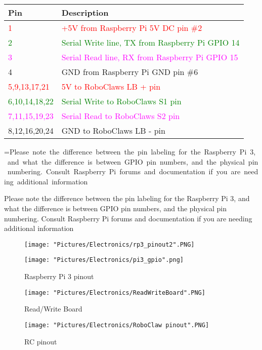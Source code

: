 \documentclass[12pt]{article}
\makeatletter
\newcommand{\mybox}[1]{%
  \setbox0=\hbox{#1}%
  \setlength{\@tempdima}{\dimexpr\wd0+13pt}%
  \begin{tcolorbox}[colframe=mycolor,boxrule=0.5pt,arc=4pt,
      left=6pt,right=6pt,top=6pt,bottom=6pt,boxsep=0pt,width=0.95\textwidth]
    #1
  \end{tcolorbox}
}
\makeatother
\begin{document}
\begin{tabular}[2] {| p{2.5cm} | p{11cm} |}
	\hline
	\textbf{Pin} & \textbf{Description} \\ \hline
	\textcolor{red}{1} & \textcolor{red}{+5V from Raspberry Pi 5V DC pin \#2} \\ \hline
	\textcolor{green}{2} & \textcolor{green}{Serial Write line, TX from Raspberry Pi GPIO 14} \\ \hline
	\textcolor{magenta}{3} & \textcolor{magenta}{Serial Read line, RX from Raspberry Pi GPIO 15}	\\ \hline
	4 & GND from Raspberry Pi GND pin \#6 \\ \hline
	\textcolor{red}{5,9,13,17,21} & \textcolor{red}{5V to RoboClaws LB + pin} \\ \hline
	\textcolor{green}{6,10,14,18,22} & \textcolor{green}{Serial Write to RoboClaws S1 pin} \\ \hline
	\textcolor{magenta}{7,11,15,19,23} & \textcolor{magenta}{Serial Read to RoboClaws S2 pin} \\ \hline
	8,12,16,20,24 & GND to RoboClaws LB - pin \\ \hline 
\end{tabular}

\bigskip 

\mybox{Please note the difference between the pin labeling for the Raspberry Pi 3, and what the difference is between GPIO pin numbers, and the physical pin numbering. Consult Raspberry Pi forums and documentation if you are needing additional information}


\begin{figure}[H]
 	\centering
  	\begin{minipage}[b]{0.35\textwidth}
		\texttt{[image: "Pictures/Electronics/rp3\_pinout2".PNG]}
  	\end{minipage}
  	\hfill
  	\begin{minipage}[b]{0.45\textwidth}
    		\texttt{[image: "Pictures/Electronics/pi3\_gpio".png]}
  	\end{minipage}
	\caption{Raspberry Pi 3 pinout}
	\label{RPi 3 pinout}
\end{figure}

\begin{figure}[H]
 	\centering
	\texttt{[image: "Pictures/Electronics/ReadWriteBoard".PNG]}
 	\caption{Read/Write Board}
	\label{Read/Write Board}
\end{figure}

\begin{figure}[H]
 	\centering
	\texttt{[image: "Pictures/Electronics/RoboClaw pinout".PNG]}
 	\caption{RC pinout}
	\label{RC pinout}
\end{figure}
\end{document}
